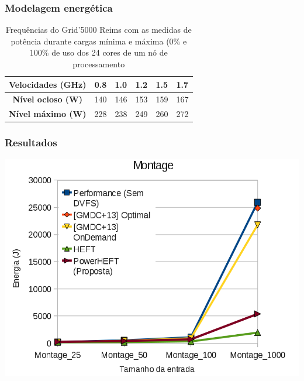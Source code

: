 \documentclass{beamer}
\begin{document}
\begin{frame}
\frametitle{Modelagem energética}

\begin{table}
    \begin{tabular}{c|cllll}
    \hline
    \textbf{Velocidades (GHz)} & \textbf{0.8} & \textbf{1.0} & \textbf{1.2} & \textbf{1.5} & \textbf{1.7} \\ \hline
    \textbf{Nível ocioso (W)}       & 140          & 146          & 153          & 159          & 167          \\
    \textbf{Nível máximo (W)}  & 228          & 238          & 249          & 260          & 272          \\ \hline
    \end{tabular}
    \caption{Frequências do Grid'5000 Reims com as medidas de potência durante
    cargas mínima e máxima (0\% e 100\% de uso dos 24 cores de um nó de processamento
    \cite{guerout:energy_aware_simulation}}
\end{table}


\end{frame}


\begin{frame}
\frametitle{Resultados}
	\begin{center}
		\includegraphics[width=0.9\columnwidth]{Montage.png}
	\end{center}
\end{frame}
\end{document}
